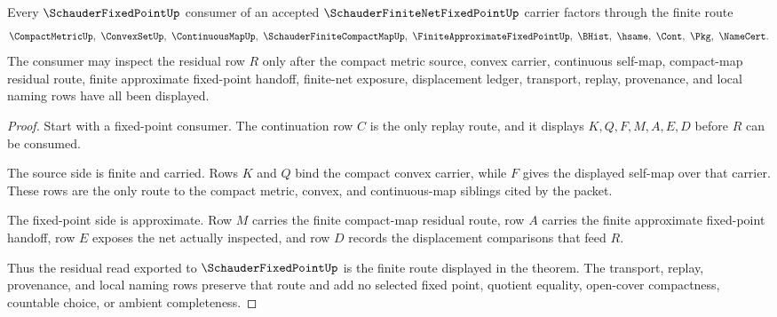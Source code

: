 \begin{theorem}
\label{thm:schauder-finite-net-fixed-point-approximate-route}
Every $\SchauderFixedPointUp$ consumer of an accepted $\SchauderFiniteNetFixedPointUp$ carrier factors through the finite route
$$
\CompactMetricUp,\ \ConvexSetUp,\ \ContinuousMapUp,\ \SchauderFiniteCompactMapUp,\ \FiniteApproximateFixedPointUp,\ \BHist,\ \hsame,\ \Cont,\ \Pkg,\ \NameCert .
$$
The consumer may inspect the residual row $R$ only after the compact metric source, convex carrier, continuous self-map, compact-map residual route, finite approximate fixed-point handoff, finite-net exposure, displacement ledger, transport, replay, provenance, and local naming rows have all been displayed.
\end{theorem}
\begin{proof}
Start with a fixed-point consumer. The continuation row $C$ is the only replay route, and it displays $K,Q,F,M,A,E,D$ before $R$ can be consumed.

The source side is finite and carried. Rows $K$ and $Q$ bind the compact convex carrier, while $F$ gives the displayed self-map over that carrier. These rows are the only route to the compact metric, convex, and continuous-map siblings cited by the packet.

The fixed-point side is approximate. Row $M$ carries the finite compact-map residual route, row $A$ carries the finite approximate fixed-point handoff, row $E$ exposes the net actually inspected, and row $D$ records the displacement comparisons that feed $R$.

Thus the residual read exported to $\SchauderFixedPointUp$ is the finite route displayed in the theorem. The transport, replay, provenance, and local naming rows preserve that route and add no selected fixed point, quotient equality, open-cover compactness, countable choice, or ambient completeness.
\end{proof}


